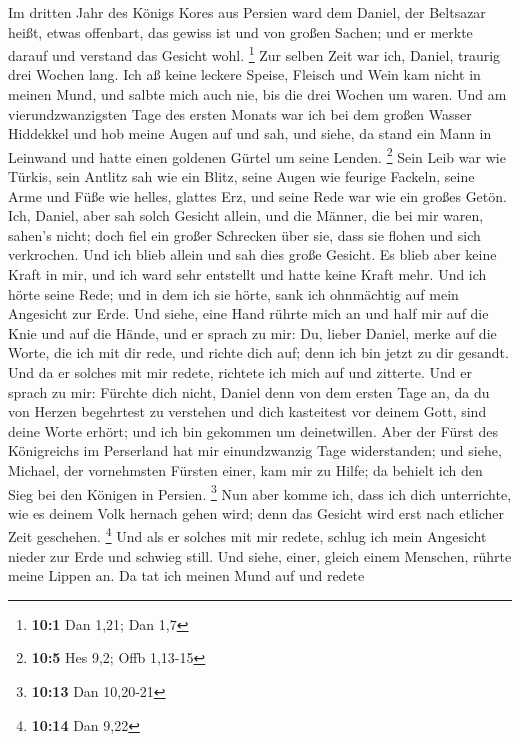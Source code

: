  Im dritten Jahr des Königs Kores aus Persien ward dem
Daniel, der Beltsazar heißt, etwas offenbart, das gewiss ist und von
großen Sachen; und er merkte darauf und verstand das Gesicht wohl.
\footnote{\textbf{10:1} Dan 1,21; Dan 1,7}  Zur selben
Zeit war ich, Daniel, traurig drei Wochen lang.  Ich aß
keine leckere Speise, Fleisch und Wein kam nicht in meinen Mund, und
salbte mich auch nie, bis die drei Wochen um waren.  Und
am vierundzwanzigsten Tage des ersten Monats war ich bei dem großen
Wasser Hiddekkel  und hob meine Augen auf und sah, und
siehe, da stand ein Mann in Leinwand und hatte einen goldenen Gürtel um
seine Lenden. \footnote{\textbf{10:5} Hes 9,2; Offb 1,13-15}
 Sein Leib war wie Türkis, sein Antlitz sah wie ein Blitz,
seine Augen wie feurige Fackeln, seine Arme und Füße wie helles, glattes
Erz, und seine Rede war wie ein großes Getön.  Ich,
Daniel, aber sah solch Gesicht allein, und die Männer, die bei mir
waren, sahen's nicht; doch fiel ein großer Schrecken über sie, dass sie
flohen und sich verkrochen.  Und ich blieb allein und sah
dies große Gesicht. Es blieb aber keine Kraft in mir, und ich ward sehr
entstellt und hatte keine Kraft mehr.  Und ich hörte seine
Rede; und in dem ich sie hörte, sank ich ohnmächtig auf mein Angesicht
zur Erde.  Und siehe, eine Hand rührte mich an und half
mir auf die Knie und auf die Hände,  und er sprach zu
mir: Du, lieber Daniel, merke auf die Worte, die ich mit dir rede, und
richte dich auf; denn ich bin jetzt zu dir gesandt. Und da er solches
mit mir redete, richtete ich mich auf und zitterte.  Und
er sprach zu mir: Fürchte dich nicht, Daniel denn von dem ersten Tage
an, da du von Herzen begehrtest zu verstehen und dich kasteitest vor
deinem Gott, sind deine Worte erhört; und ich bin gekommen um
deinetwillen.  Aber der Fürst des Königreichs im
Perserland hat mir einundzwanzig Tage widerstanden; und siehe, Michael,
der vornehmsten Fürsten einer, kam mir zu Hilfe; da behielt ich den Sieg
bei den Königen in Persien. \footnote{\textbf{10:13} Dan 10,20-21}
 Nun aber komme ich, dass ich dich unterrichte, wie es
deinem Volk hernach gehen wird; denn das Gesicht wird erst nach etlicher
Zeit geschehen. \footnote{\textbf{10:14} Dan 9,22}  Und
als er solches mit mir redete, schlug ich mein Angesicht nieder zur Erde
und schwieg still.  Und siehe, einer, gleich einem
Menschen, rührte meine Lippen an. Da tat ich meinen Mund auf und redete
